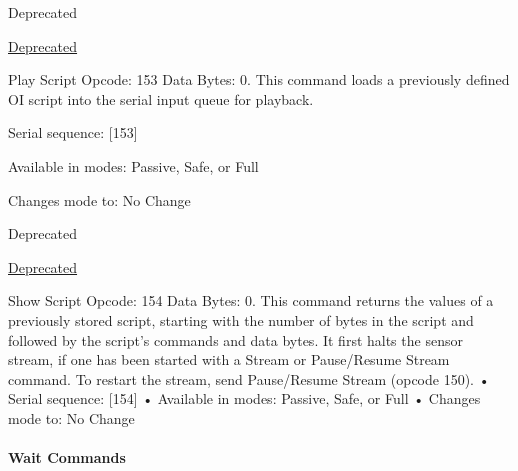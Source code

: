\begin{Desc}
\begin{description}
\begin{DoxyRefDesc}{Deprecated}
\item[\hyperlink{deprecated__deprecated000004}{Deprecated}]\end{DoxyRefDesc}
\item[{\em 
\hypertarget{group__roomba-lib_gga305e17dfb7050ad83ea49ded2e6a2e24a83540b81be6becb532a766b7dd3a5ade}{}P\+L\+A\+Y\+\_\+\+S\+C\+R\+I\+P\+T\label{group__roomba-lib_gga305e17dfb7050ad83ea49ded2e6a2e24a83540b81be6becb532a766b7dd3a5ade}
}]Play Script Opcode\+: 153 Data Bytes\+: 0. This command loads a previously defined O\+I script into the serial input queue for playback.
\begin{DoxyItemize}
\item Serial sequence\+: \mbox{[}153\mbox{]}
\item Available in modes\+: Passive, Safe, or Full
\item Changes mode to\+: No Change
\end{DoxyItemize}

\begin{DoxyRefDesc}{Deprecated}
\item[\hyperlink{deprecated__deprecated000005}{Deprecated}]\end{DoxyRefDesc}
\item[{\em 
\hypertarget{group__roomba-lib_gga305e17dfb7050ad83ea49ded2e6a2e24a709160dfcdb78b233459a7c046b91b5c}{}S\+H\+O\+W\+\_\+\+S\+C\+R\+I\+P\+T\label{group__roomba-lib_gga305e17dfb7050ad83ea49ded2e6a2e24a709160dfcdb78b233459a7c046b91b5c}
}]Show Script Opcode\+: 154 Data Bytes\+: 0. This command returns the values of a previously stored script, starting with the number of bytes in the script and followed by the script’s commands and data bytes. It first halts the sensor stream, if one has been started with a Stream or Pause/\+Resume Stream command. To restart the stream, send Pause/\+Resume Stream (opcode 150). • Serial sequence\+: \mbox{[}154\mbox{]} • Available in modes\+: Passive, Safe, or Full • Changes mode to\+: No Change

\paragraph*{Wait Commands}


\end{description}
\end{Desc}
